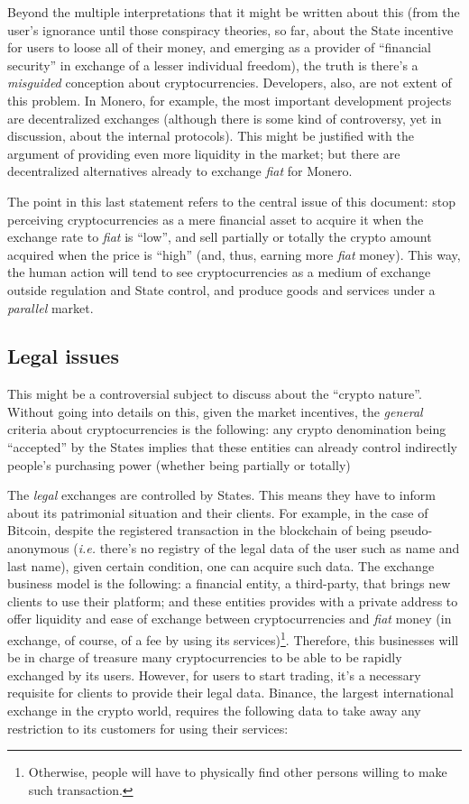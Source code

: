 \documentclass[12pt,a4paper]{article}
\begin{document}
Beyond the multiple interpretations that it might be written about this (from the user's ignorance until those conspiracy theories, so far, about the State incentive for users to loose all of their money, and emerging as a provider of “financial security” in exchange of a lesser individual freedom), the truth is there's a \textit{misguided} conception about cryptocurrencies. Developers, also, are not extent of this problem. In Monero, for example, the most important development projects are decentralized exchanges (although there is some kind of controversy, yet in discussion, about the internal protocols). This might be justified with the argument of providing even more liquidity in the market; but there are decentralized alternatives already to exchange \textit{fiat} for Monero.

The point in this last statement refers to the central issue of this document: stop perceiving cryptocurrencies as a mere financial asset to acquire it when the exchange rate to \textit{fiat} is “low”, and sell partially or totally the crypto amount acquired when the price is “high” (and, thus, earning more \textit{fiat} money). This way, the human action will tend to see cryptocurrencies as a medium of exchange outside regulation and State control, and produce goods and services under a \textit{parallel} market.

\subsection{Legal issues}
This might be a controversial subject to discuss about the “crypto nature”. Without going into details on this, given the market incentives, the \textit{general} criteria about cryptocurrencies is the following: any crypto denomination being “accepted” by the States implies that these entities can already control indirectly people's purchasing power (whether being partially or totally)

The \textit{legal} exchanges are controlled by States. This means they have to inform about its patrimonial situation and their clients. For example, in the case of Bitcoin, despite the registered transaction in the blockchain of being pseudo-anonymous (\textit{i.e.} there's no registry of the legal data of the user such as name and last name), given certain condition, one can acquire such data. The exchange business model is the following: a financial entity, a third-party, that brings new clients to use their platform; and these entities provides with a private address to offer liquidity and ease of exchange between cryptocurrencies and \textit{fiat} money (in exchange, of course, of a fee by using its services)\footnote{Otherwise, people will have to physically find other persons willing to make such transaction.}. Therefore, this businesses will be in charge of treasure many cryptocurrencies to be able to be rapidly exchanged by its users. However, for users to start trading, it's a necessary requisite for clients to provide their legal data. Binance, the largest international exchange in the crypto world, requires the following data to take away any restriction to its customers for using their services:
\end{document}
